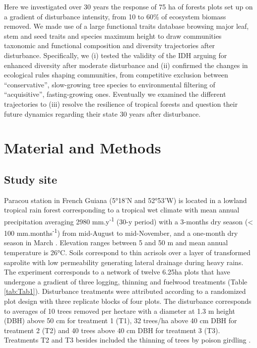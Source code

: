 \documentclass[fleqn,10pt]{ArtEcoFoG} %
\theoremstyle{definition}
\theoremstyle{definition}
\theoremstyle{definition}
\theoremstyle{remark}
\begin{document}
Here we investigated over 30 years the response of 75 ha of forests
plots set up on a gradient of disturbance intensity, from 10 to 60\% of
ecosystem biomass removed. We made use of a large functional traits
database browsing major leaf, stem and seed traits and species maximum
height to draw communities taxonomic and functional composition and
diversity trajectories after disturbance. Specifically, we (i) tested
the validity of the IDH arguing for enhanced diversity after moderate
disturbance and (ii) confirmed the changes in ecological rules shaping
communities, from competitive exclusion between ``conservative'',
slow-growing tree species to environmental filtering of ``acquisitive'',
fasting-growing ones. Eventually we examined the different trajectories
to (iii) resolve the resilience of tropical forests and question their
future dynamics regarding their state 30 years after disturbance.

\section{Material and Methods}\label{material-and-methods}

\subsection{Study site}\label{study-site}

Paracou station in French Guiana (5°18'N and 52°53'W) is located in a
lowland tropical rain forest corresponding to a tropical wet climate
with mean annual precipitation averaging 2980 mm.y\textsuperscript{-1}
(30-y period) with a 3-months dry season (\textless{} 100
mm.months\textsuperscript{-1}) from mid-August to mid-November, and a
one-month dry season in March \citep{Wagner2011}. Elevation ranges
between 5 and 50 m and mean annual temperature is 26°C. Soils correspond
to thin acrisols over a layer of transformed saprolite with low
permeability generating lateral drainage during heavy rains. The
experiment corresponds to a network of twelve 6.25ha plots that have
undergone a gradient of three logging, thinning and fuelwood treatments
(Table \ref{tab:Tab1}). Disturbance treatments were attributed according
to a randomized plot design with three replicate blocks of four plots.
The disturbance corresponds to averages of 10 trees removed per hectare
with a diameter at 1.3 m height (DBH) above 50 cm for treatment 1 (T1),
32 trees/ha above 40 cm DBH for treatment 2 (T2) and 40 trees above 40
cm DBH for treatment 3 (T3). Treatments T2 and T3 besides included the
thinning of trees by poison girdling \citep{Blanc2009}.
\end{document}
